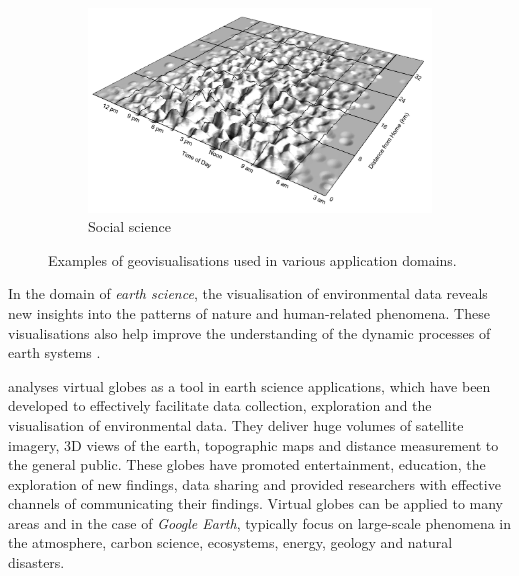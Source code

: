 \documentclass[
	fontsize=11pt
	headlines=2,
	footlines=2,
	parskip=half
]{scrartcl}
\newcommand{\subfigcaptionskip}{\vspace{-10pt}}
\newcommand{\bibentry}[1]{
	\addtocategory{exclude}{#1}
	\fullcite{#1}
}
\begin{document}
{{\begin{figure}[H]
\begin{subfigure}[b]{\applicationwidth}
	                \label{fig:public_health}
		        \end{subfigure}
		        \begin{subfigure}[b]{\applicationwidth}
	                \includegraphics[width=\textwidth,height=\applicationheight]{images/social-science}
	                	\caption{Social science \parencite{kwan2004geovisualization}}
	                \label{fig:social_science}
		        \end{subfigure}
				\caption{Examples of geovisualisations used in various application domains.}
				\subfigcaptionskip
				\label{fig:geovisualisation_applications}
			\end{figure}


			In the domain of \emph{earth science}, the visualisation of environmental data reveals new insights into the patterns of nature and human-related phenomena. These visualisations also help improve the understanding of the dynamic processes of earth systems \parencite{yu2012google}.

			\textcite{yu2012google} analyses virtual globes as a tool in earth science applications, which have been developed to effectively facilitate data collection, exploration and the visualisation of environmental data. They deliver huge volumes of satellite imagery, 3D views of the earth, topographic maps and distance measurement to the general public. These globes have promoted entertainment, education, the exploration of new findings, data sharing and provided researchers with effective channels of communicating their findings. Virtual globes can be applied to many areas and in the case of \emph{Google Earth}, typically focus on large-scale phenomena in the atmosphere, carbon science, ecosystems, energy, geology and natural disasters.

}}
\end{document}
